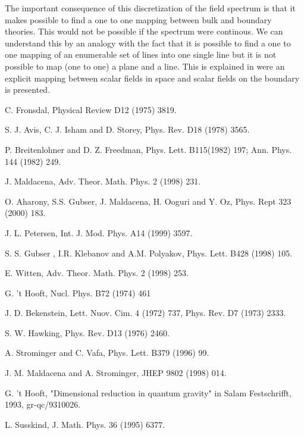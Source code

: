 \documentclass[a4paper,twocolumn,prd,groupedaddress,nofootinbib]{revtex4}
\begin{document}
\bigskip

\noindent The important consequence of this discretization of the field spectrum is 
that it makes possible to
find a one to one mapping between bulk and boundary theories.
This would not be possible if the spectrum were continous.
We can understand this by an analogy with the fact that it is possible to find 
a one to one mapping of an enumerable set of lines 
into one single line but it is not possible to map (one to one) a plane and a line.
This is explained in \cite{BB4} were an explicit mapping between scalar fields 
in \coordHE{} space and scalar fields on the boundary is presented.
   
\vspace{1cm}
\begin{thebibliography}{100}
 C. Fronsdal, Physical Review D12 (1975) 3819.

 S. J. Avis, C. J. Isham and D. Storey, Phys. Rev. D18
(1978) 3565.

 P. Breitenlohner and D. Z. Freedman, 
Phys. Lett. B115(1982) 197; Ann. Phys. 144 (1982) 249.

 J. Maldacena, Adv. Theor. Math. Phys. 2 (1998) 231.


 O. Aharony, S.S. Gubser, J. Maldacena, 
H. Ooguri and Y. Oz, Phys. Rept 323 (2000) 183.

 J. L. Petersen, Int. J. Mod. Phys. A14 (1999) 3597.

 S. S. Gubser , I.R. Klebanov and A.M. Polyakov, 
Phys. Lett. B428 (1998) 105.

 E. Witten, Adv. Theor. Math. Phys. 2 (1998) 253.

 G. 't Hooft,  Nucl. Phys. B72 (1974) 461 

 J. D. Bekenstein, Lett. Nuov. Cim. 4 (1972) 737, 
Phys. Rev. D7 (1973) 2333.

 S. W. Hawking, Phys. Rev. D13 (1976) 2460.

 A. Strominger and C. Vafa, Phys. Lett. B379 (1996) 99.

 J. M. Maldacena and  A. Strominger,  JHEP 9802 (1998) 014.

 G. 't Hooft, "Dimensional reduction in quantum gravity"
in Salam Festschrifft, 1993, gr-qc/9310026.

 L. Susskind, J. Math. Phys. 36 (1995) 6377.
 

\end{thebibliography}
\end{document}
